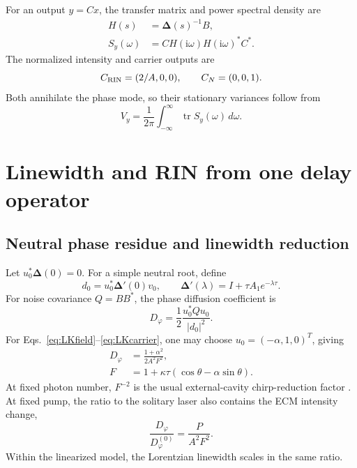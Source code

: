 \documentclass{optica-article}
\newcommand{\ii}{\mathrm{i}}
\newcommand{\Tr}{\operatorname{tr}}
\newcommand{\Dmat}{\bm{\Delta}}
\begin{document}
For an output $y=Cx$, the transfer matrix and power spectral density are
\begin{align}
 H(s)&=\Dmat(s)^{-1}B, \label{eq:transfer}\\
 S_y(\omega)&=CH(\ii\omega)H(\ii\omega)^*C^*. \label{eq:psd}
\end{align}
The normalized intensity and carrier outputs are
\begin{equation}
 C_{\rm RIN}=(2/A,0,0),\qquad C_N=(0,0,1).
 \label{eq:outputs}
\end{equation}
Both annihilate the phase mode, so their stationary variances follow from
\begin{equation}
 V_y=\frac{1}{2\pi}\int_{-\infty}^{\infty}\Tr S_y(\omega)\,d\omega.
 \label{eq:variance}
\end{equation}

\section{Linewidth and RIN from one delay operator}

\subsection{Neutral phase residue and linewidth reduction}

Let $u_0^*\Dmat(0)=0$. For a simple neutral root, define
\begin{equation}
 d_0=u_0^*\Dmat'(0)v_0,\qquad
 \Dmat'(\lambda)=I+\tau A_1e^{-\lambda\tau}.
 \label{eq:d0}
\end{equation}
For noise covariance $Q=BB^*$, the phase diffusion coefficient is
\begin{equation}
 D_\varphi=\frac{1}{2}\frac{u_0^*Qu_0}{|d_0|^2}.
 \label{eq:Dgeneral}
\end{equation}
For Eqs.~\eqref{eq:LKfield}--\eqref{eq:LKcarrier}, one may choose $u_0=(-\alpha,1,0)^T$, giving
\begin{align}
 D_\varphi&=\frac{1+\alpha^2}{2A^2F^2}, \label{eq:Dphase}\\
 F&=1+\kappa\tau(\cos\theta-\alpha\sin\theta). \label{eq:F}
\end{align}
At fixed photon number, $F^{-2}$ is the usual external-cavity chirp-reduction factor \cite{KazarinovHenry1987}. At fixed pump, the ratio to the solitary laser also contains the ECM intensity change,
\begin{equation}
 \frac{D_\varphi}{D_\varphi^{(0)}}=\frac{P}{A^2F^2}.
 \label{eq:Dratio}
\end{equation}
Within the linearized model, the Lorentzian linewidth scales in the same ratio.
\end{document}
